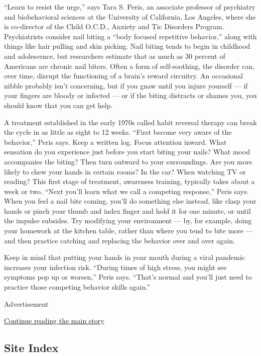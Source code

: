``Learn to resist the urge,'' says Tara S. Peris, an associate professor
of psychiatry and biobehavioral sciences at the University of
California, Los Angeles, where she is co-director of the Child O.C.D.,
Anxiety and Tic Disorders Program. Psychiatrists consider nail biting a
``body focused repetitive behavior,'' along with things like hair
pulling and skin picking. Nail biting tends to begin in childhood and
adolescence, but researchers estimate that as much as 30 percent of
Americans are chronic nail biters. Often a form of self-soothing, the
disorder can, over time, disrupt the functioning of a brain's reward
circuitry. An occasional nibble probably isn't concerning, but if you
gnaw until you injure yourself --- if your fingers are bloody or
infected --- or if the biting distracts or shames you, you should know
that you can get help.

A treatment established in the early 1970s called habit reversal therapy
can break the cycle in as little as eight to 12 weeks. ``First become
very aware of the behavior,'' Peris says. Keep a written log. Focus
attention inward. What sensation do you experience just before you start
biting your nails? What mood accompanies the biting? Then turn outward
to your surroundings. Are you more likely to chew your hands in certain
rooms? In the car? When watching TV or reading? This first stage of
treatment, awareness training, typically takes about a week or two.
``Next you'll learn what we call a competing response,'' Peris says.
When you feel a nail bite coming, you'll do something else instead, like
clasp your hands or pinch your thumb and index finger and hold it for
one minute, or until the impulse subsides. Try modifying your
environment --- by, for example, doing your homework at the kitchen
table, rather than where you tend to bite more --- and then practice
catching and replacing the behavior over and over again.

Keep in mind that putting your hands in your mouth during a viral
pandemic increases your infection risk. ``During times of high stress,
you might see symptoms pop up or worsen,'' Peris says. ``That's normal
and you'll just need to practice those competing behavior skills
again.''

Advertisement

\protect\hyperlink{after-bottom}{Continue reading the main story}

\hypertarget{site-index}{%
\subsection{Site Index}\label{site-index}}

